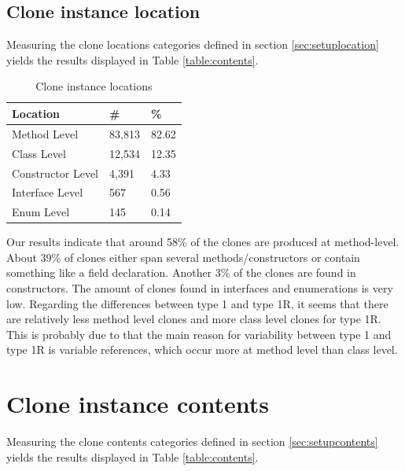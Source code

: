\subsection{Clone instance location}\label{chap:clonelocation}
Measuring the clone locations categories defined in section \ref{sec:setuplocation} yields the results displayed in Table \ref{table:contents}.

\begin{table}[H]
  \begin{center}
  \caption{Clone instance locations} \label{table:locations}
  \medskip
\begin{tabular}{|l|l|l|}
\hline
\textbf{Location}   & \textbf{\#} & \textbf{\%} \\ \hline
Method Level        & 83,813 & 82.62            \\ \hline
Class Level        & 12,534 & 12.35            \\ \hline
Constructor Level    & 4,391 & 4.33           \\ \hline
Interface Level   & 567 & 0.56           \\ \hline
Enum Level         & 145 & 0.14            \\ \hline
\end{tabular}
\end{center}
\end{table}

Our results indicate that around 58\% of the clones are produced at method-level. About 39\% of clones either span several methods/constructors or contain something like a field declaration. Another 3\% of the clones are found in constructors. The amount of clones found in interfaces and enumerations is very low. Regarding the differences between type 1 and type 1R, it seems that there are relatively less method level clones and more class level clones for type 1R. This is probably due to that the main reason for variability between type 1 and type 1R is variable references, which occur more at method level than class level.

\section{Clone instance contents}\label{chap:clonecontents}
Measuring the clone contents categories defined in section \ref{sec:setupcontents} yields the results displayed in Table \ref{table:contents}.

